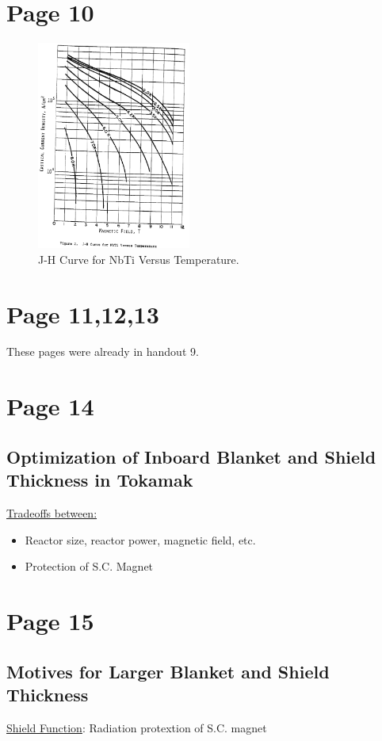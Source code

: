 \documentclass[11pt]{report} %
\begin{document}
\section{Page 10}
\begin{figure}[H]
  \centering
  \includegraphics[width=0.45\textwidth]{figs/CriticalCurrent.png}
  \caption{J-H Curve for NbTi Versus Temperature.}
\end{figure}

\section{Page 11,12,13}
These pages were already in handout 9.

\section{Page 14}
\subsection{Optimization of Inboard Blanket and Shield Thickness in Tokamak}
\underline{Tradeoffs between:}
\begin{itemize}
\item Reactor size, reactor power, magnetic field, etc.
\item Protection of S.C. Magnet
\end{itemize}
\section{Page 15}
\subsection{Motives for Larger Blanket and Shield Thickness}
\underline{Shield Function}: Radiation protextion of S.C. magnet
\end{document}
